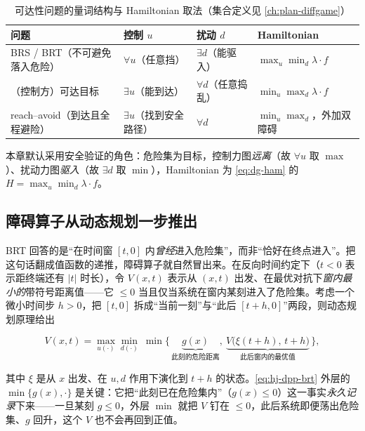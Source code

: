 \begin{table}[H]\centering\small
\caption{可达性问题的量词结构与 Hamiltonian 取法（集合定义见 \cref{ch:plan-diffgame}）}
\label{tab:hj-quantifier}
\begin{tabular}{llll}
\toprule
问题 & 控制 $u$ & 扰动 $d$ & Hamiltonian \\
\midrule
BRS / BRT（不可避免落入危险） & $\forall u$（任意挡） & $\exists d$（能驱入） & $\max_u\min_d\lambda\cdot f$ \\
（控制方）可达目标 & $\exists u$（能到达） & $\forall d$（任意捣乱） & $\min_u\max_d\lambda\cdot f$ \\
reach--avoid（到达且全程避险） & $\exists u$（找到安全路径） & $\forall d$ & $\min_u\max_d$，外加双障碍 \\
\bottomrule
\end{tabular}
\end{table}

\noindent{}本章默认采用安全验证的角色：危险集为目标，控制力图\emph{远离}（故 $\forall u$ 取 $\max$）、扰动力图\emph{驱入}（故 $\exists d$ 取 $\min$），Hamiltonian 为 \cref{eq:dg-ham} 的 $H=\max_u\min_d\lambda\cdot f$。

\subsection{障碍算子从动态规划一步推出}
\label{sec:hj-dpp-obstacle}

BRT 回答的是“在时间窗 $[t,0]$ 内\emph{曾经}进入危险集”，而非“恰好在终点进入”。把这句话翻成值函数的递推，障碍算子就自然冒出来。在反向时间约定下（$t<0$ 表示距终端还有 $|t|$ 时长），令 $V(x,t)$ 表示从 $(x,t)$ 出发、在最优对抗下\emph{窗内最小的}带符号距离值——它 $\le0$ 当且仅当系统在窗内某刻进入了危险集。考虑一个微小时间步 $h>0$，把 $[t,0]$ 拆成“当前一刻”与“此后 $[t+h,0]$”两段，则动态规划原理给出

\begin{equation}
  V(x,t)=\max_{u(\cdot)}\min_{d(\cdot)}\ \min\Big\{\,\underbrace{g(x)}_{\text{此刻的危险距离}},\ \underbrace{V\big(\xi(t{+}h),\,t{+}h\big)}_{\text{此后窗内的最优值}}\,\Big\},
  \label{eq:hj-dpp-brt}
\end{equation}

其中 $\xi$ 是从 $x$ 出发、在 $u,d$ 作用下演化到 $t+h$ 的状态。\cref{eq:hj-dpp-brt} 外层的 $\min\{g(x),\cdot\}$ 是关键：它把“此刻已在危险集内”（$g(x)\le0$）这一事实\emph{永久记录}下来——一旦某刻 $g\le0$，外层 $\min$ 就把 $V$ 钉在 $\le0$，此后系统即便荡出危险集、$g$ 回升，这个 $V$ 也不会再回到正值。

